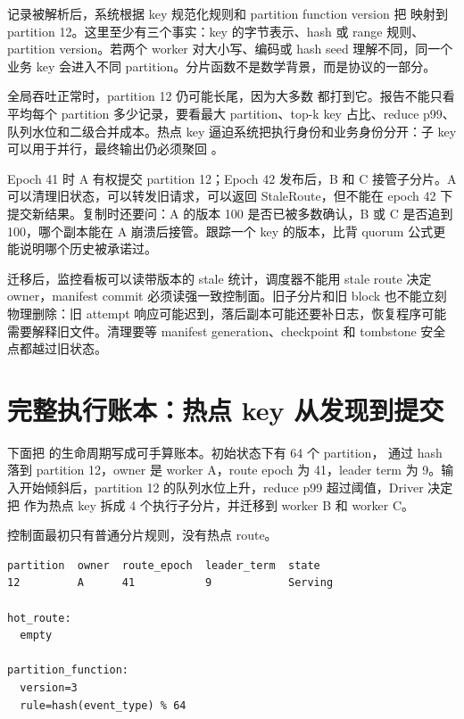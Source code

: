 记录被解析后，系统根据 key 规范化规则和 partition function version 把  映射到 partition 12。这里至少有三个事实：key 的字节表示、hash 或 range 规则、partition version。若两个 worker 对大小写、编码或 hash seed 理解不同，同一个业务 key 会进入不同 partition。分片函数不是数学背景，而是协议的一部分。

全局吞吐正常时，partition 12 仍可能长尾，因为大多数  都打到它。报告不能只看平均每个 partition 多少记录，要看最大 partition、top-k key 占比、reduce p99、队列水位和二级合并成本。热点 key 逼迫系统把执行身份和业务身份分开：子 key 可以用于并行，最终输出仍必须聚回 。

Epoch 41 时 A 有权提交 partition 12；Epoch 42 发布后，B 和 C 接管子分片。A 可以清理旧状态，可以转发旧请求，可以返回 StaleRoute，但不能在 epoch 42 下提交新结果。复制时还要问：A 的版本 100 是否已被多数确认，B 或 C 是否追到 100，哪个副本能在 A 崩溃后接管。跟踪一个 key 的版本，比背 quorum 公式更能说明哪个历史被承诺过。

迁移后，监控看板可以读带版本的 stale 统计，调度器不能用 stale route 决定 owner，manifest commit 必须读强一致控制面。旧子分片和旧 block 也不能立刻物理删除：旧 attempt 响应可能迟到，落后副本可能还要补日志，恢复程序可能需要解释旧文件。清理要等 manifest generation、checkpoint 和 tombstone 安全点都越过旧状态。

\section{完整执行账本：热点 key 从发现到提交}

下面把  的生命周期写成可手算账本。初始状态下有 64 个 partition， 通过 hash 落到 partition 12，owner 是 worker A，route epoch 为 41，leader term 为 9。输入开始倾斜后，partition 12 的队列水位上升，reduce p99 超过阈值，Driver 决定把  作为热点 key 拆成 4 个执行子分片，并迁移到 worker B 和 worker C。

控制面最初只有普通分片规则，没有热点 route。

\begin{lstlisting}[numbers=none,caption={初始 assignment 表}]
partition  owner  route_epoch  leader_term  state
12         A      41           9            Serving

hot_route:
  empty

partition_function:
  version=3
  rule=hash(event_type) % 64
\end{lstlisting}

